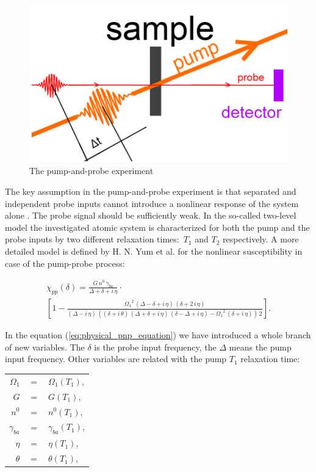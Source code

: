 \documentclass[12pt,twoside,a4paper]{article}
\numberwithin{equation}{subsection}
\numberwithin{figure}{subsection}
\begin{document}
\begin{figure} 
	\begin{center}
		\includegraphics{img/pnp.png}
		\caption{The pump-and-probe experiment\label{fig:physical_pnp_fig}}
	\end{center}
\end{figure}

The key assumption in the pump-and-probe experiment is that separated and independent probe inputs cannot introduce a nonlinear
response of the system alone \cite{boyd_nlo}. The probe signal should be sufficiently weak. In the so-called two-level model the
investigated atomic system is characterized for both the pump and the probe inputs by two different relaxation times:~${T_{1}}$ 
and ${T_{2}}$ respectively. A more detailed model is defined by H. N. Yum et al. \cite{yum_pump} for the nonlinear susceptibility in
case of the pump-probe process:

\begin{multline}   \label{eq:physical_pnp_equation}
     \chi_{pp} (\delta ) = \frac {G\,n^{0}\,{\gamma_{ba}}}{\Delta  + \delta  + i\,\eta } \cdot \\
     [1 - \frac {{\Omega_{1}}^{2}\,(\Delta  - \delta  + i\,\eta )\,(\delta  + 2\,i\,\eta )}{(\Delta  - i\,\eta )\,((\delta  + i\,
     \theta)\,(\Delta  + \delta  + i\,\eta )\,(\delta  - \Delta  + i\,\eta ) - {\Omega_{1}}^{2}\,(\delta  + i\,\eta ))\,2}].
\end{multline}

In the equation (\ref{eq:physical_pnp_equation}) we have introduced a whole branch of new variables. The $\delta $ is the probe
input frequency, the $\Delta $ means the pump input frequency. Other variables are related with the pump $ T_{1} $ relaxation time:

\begin{tabular} {r c l}
	$ \Omega_{1} $  & $ = $ & $ \Omega_{1} ( T_{1} )$, \\
	$ G $           & $ = $ & $  G ( T_{1} )$, \\
	$ n^{0} $       & $ = $ & $  n^{0} ( T_{1} )$, \\
	$ \gamma_{ba} $ & $ = $ & $  \gamma_{ba} ( T_{1} )$, \\
	$ \eta $        & $ = $ & $  \eta ( T_{1} )$, \\
	$ \theta $      & $ = $ & $  \theta ( T_{1} )$, \\
\end{tabular}
\end{document}

